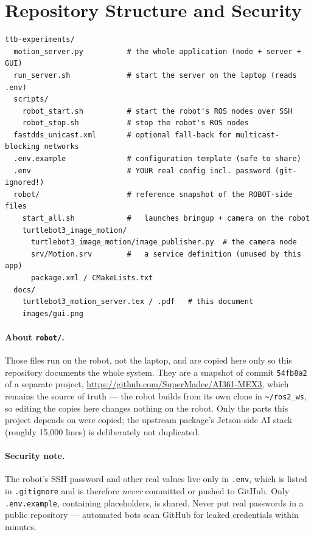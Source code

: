 \documentclass[11pt,a4paper]{article}
\newcommand{\code}[1]{\texttt{#1}}
\begin{document}
\section{Repository Structure and Security}
\begin{lstlisting}[style=bash]
ttb-experiments/
  motion_server.py          # the whole application (node + server + GUI)
  run_server.sh             # start the server on the laptop (reads .env)
  scripts/
    robot_start.sh          # start the robot's ROS nodes over SSH
    robot_stop.sh           # stop the robot's ROS nodes
  fastdds_unicast.xml       # optional fall-back for multicast-blocking networks
  .env.example              # configuration template (safe to share)
  .env                      # YOUR real config incl. password (git-ignored!)
  robot/                    # reference snapshot of the ROBOT-side files
    start_all.sh            #   launches bringup + camera on the robot
    turtlebot3_image_motion/
      turtlebot3_image_motion/image_publisher.py  # the camera node
      srv/Motion.srv        #   a service definition (unused by this app)
      package.xml / CMakeLists.txt
  docs/
    turtlebot3_motion_server.tex / .pdf   # this document
    images/gui.png
\end{lstlisting}

\paragraph{About \code{robot/}.} Those files run on the robot, not the laptop,
and are copied here only so this repository documents the whole system. They are
a snapshot of commit \code{54fb8a2} of a separate project,
\url{https://github.com/SuperMadee/AI361-MEX3}, which remains the source of
truth --- the robot builds from its own clone in \code{\textasciitilde/ros2\_ws},
so editing the copies here changes nothing on the robot. Only the parts this
project depends on were copied; the upstream package's Jetson-side AI stack
(roughly 15{,}000 lines) is deliberately not duplicated.

\paragraph{Security note.} The robot's SSH password and other real values live
only in \code{.env}, which is listed in \code{.gitignore} and is therefore
\emph{never} committed or pushed to GitHub. Only \code{.env.example}, containing
placeholders, is shared. Never put real passwords in a public repository ---
automated bots scan GitHub for leaked credentials within minutes.
\end{document}
